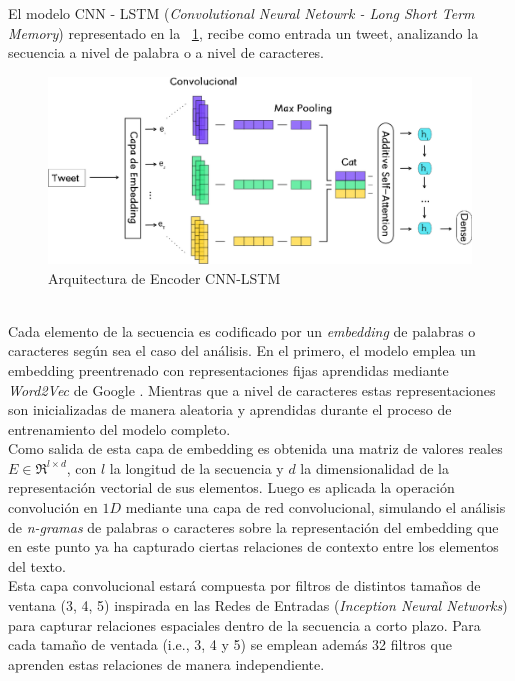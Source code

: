 	El modelo CNN - LSTM (\textit{Convolutional Neural Netowrk - Long Short Term Memory}) representado en la \figurename~\ref{cnn_lstm}, recibe como entrada un tweet, analizando la secuencia a nivel de palabra o a nivel de caracteres.
	\begin{figure}[!thb]
		\begin{center}
			\includegraphics[]{images/cnn_lstm.eps}
		\end{center}	
		\caption[CNN - LSTM]{Arquitectura de Encoder CNN-LSTM}
		\label{cnn_lstm}
	\end{figure}
	\\
	Cada elemento de la secuencia es codificado por un \textit{embedding} de palabras o caracteres según sea el caso del análisis. En el primero, el modelo emplea un embedding preentrenado con representaciones fijas aprendidas mediante \textit{Word2Vec} de Google \citep{DBLP:conf/nips/MikolovSCCD13}. Mientras que a nivel de caracteres estas representaciones son inicializadas de manera aleatoria y aprendidas durante el proceso de entrenamiento del modelo completo.
	\\
	Como salida de esta capa de embedding es obtenida una matriz de valores reales $E \in \Re^{l\times d}$, con $l$ la longitud de la secuencia y  $d$ la dimensionalidad de la representación vectorial de sus elementos. Luego es aplicada la operación convolución en $1D$ mediante una capa de red convolucional, simulando el análisis de \textit{n-gramas} de palabras o caracteres sobre la representación del embedding que en este punto ya ha capturado ciertas relaciones de contexto entre los elementos del texto.
	\\
	Esta capa convolucional estará compuesta por filtros de distintos tamaños de ventana (3, 4, 5) inspirada en las Redes de Entradas (\textit{Inception Neural Networks}) \citep{szegedy2014going} para capturar relaciones espaciales dentro de la secuencia a corto plazo. Para cada tamaño de ventada (i.e., 3, 4 y 5) se emplean además 32 filtros que aprenden estas relaciones de manera independiente. 
